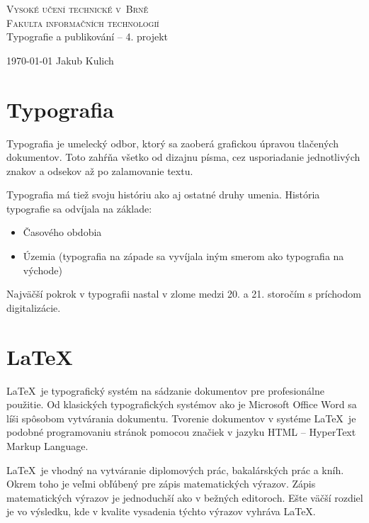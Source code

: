 \documentclass[11pt,a4paper]{article}
\begin{document}
\begin{titlepage}
\begin{center}
\Huge
\textsc{
    Vysoké učení technické v~Brně \\ [-.25em]
    \huge Fakulta informačních technologií}\\
\LARGE
Typografie a publikování -- 4. projekt \\ [-.25em]

{\Large \today \hfill
Jakub Kulich}
\end{center}
\end{titlepage}

\section{Typografia}
Typografia je umelecký odbor, ktorý sa zaoberá grafickou úpravou tlačených dokumentov. Toto zahŕňa všetko od dizajnu písma, cez usporiadanie jednotlivých znakov a odsekov až po zalamovanie textu.\cite{kniha2}


Typografia má tiež svoju históriu ako aj ostatné druhy umenia.\cite{article:his} História typografie sa odvíjala na základe: 
\begin{itemize}
    \item Časového obdobia 
    \item Územia (typografia na západe sa vyvíjala iným smerom ako typografia na východe)
\end{itemize}
Najväčší pokrok v typografii nastal v zlome medzi 20. a 21. storočím s príchodom digitalizácie.\cite{article:hist}


\section{\LaTeX}
\LaTeX~je typografický systém na sádzanie dokumentov pre profesionálne použitie.\cite{kniha1} Od klasických typografických systémov ako je Microsoft Office Word sa líši spôsobom vytvárania dokumentu. 
Tvorenie dokumentov v systéme \LaTeX~je podobné programovaniu stránok pomocou značiek v jazyku HTML -- HyperText Markup Language.\cite{html} 


\LaTeX~je vhodný na vytváranie diplomových prác\cite{diplomka}, bakalárských prác\cite{bakalarka} a kníh. Okrem toho je veľmi obľúbený pre zápis matematických výrazov. Zápis matematických výrazov je jednoduchší ako v bežných editoroch. Ešte väčší rozdiel je vo výsledku, kde v kvalite vysadenia týchto výrazov vyhráva \LaTeX.
\end{document}
